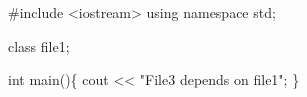 
\begin{DoxyCode}
#include <iostream>
using namespace std;


class file1;

int main()\{
    cout << "File3 depends on file1";
\}
\end{DoxyCode}
 